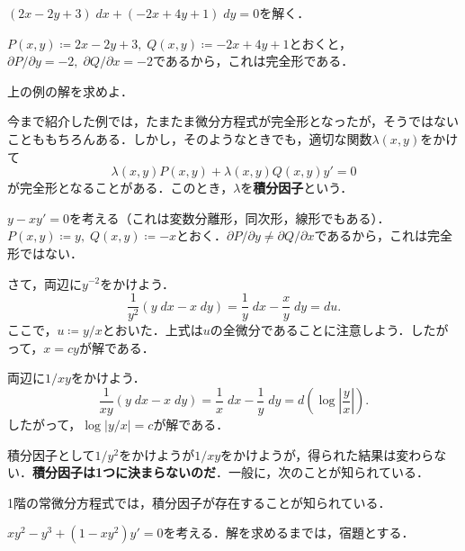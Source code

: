 \begin{example}
    $(2x-2y+3) \; dx + (-2x+4y+1) \; dy = 0$を解く．

    $P(x,y) \coloneqq 2x-2y+3, \; Q(x,y) \coloneqq -2x+4y+1$とおくと，$\partial P/\partial y = -2, \; \partial Q/\partial x = -2$であるから，これは完全形である．
\end{example}
\begin{homework*}
    上の例の解を求めよ．
\end{homework*}

今まで紹介した例では，たまたま微分方程式が完全形となったが，そうではないことももちろんある．しかし，そのようなときでも，適切な関数$\lambda(x,y)$をかけて
\[ \lambda(x,y)P(x,y) + \lambda(x,y)Q(x,y)y' = 0\]
が完全形となることがある．このとき，$\lambda$を\textbf{積分因子}という．

\begin{example}[$1/y^2$をかける]
    $y-xy'=0$を考える（これは変数分離形，同次形，線形でもある）．$P(x,y) \coloneqq y, \; Q(x,y) \coloneqq -x$とおく．$\partial P/\partial y \neq \partial Q/\partial x$であるから，これは完全形ではない．

    さて，両辺に$y^{-2}$をかけよう．
    \[ \frac{1}{y^2}(y \; dx - x \; dy) = \frac{1}{y} \; dx - \frac{x}{y} \; dy = du.\]
    ここで，$u \coloneqq y/x$とおいた．上式は$u$の全微分であることに注意しよう．したがって，$x=cy$が解である．
\end{example}

\begin{example}[$1/xy$をかける]
    両辺に$1/xy$をかけよう．
    \[ \frac{1}{xy}(y \; dx - x \; dy) = \frac{1}{x} \; dx - \frac{1}{y} \; dy = d\left(\log|\frac{y}{x}|\right).\]
    したがって，$\log|y/x|=c$が解である．
\end{example}

積分因子として$1/y^2$をかけようが$1/xy$をかけようが，得られた結果は変わらない．\textbf{積分因子は1つに決まらないのだ}．一般に，次のことが知られている．

\begin{remark}
    1階の常微分方程式では，積分因子が存在することが知られている．
\end{remark}

\begin{example} \label{example:homework-10-1}
    $xy^2-y^3+(1-xy^2)y'=0$を考える．解を求めるまでは，宿題とする．
\end{example}

